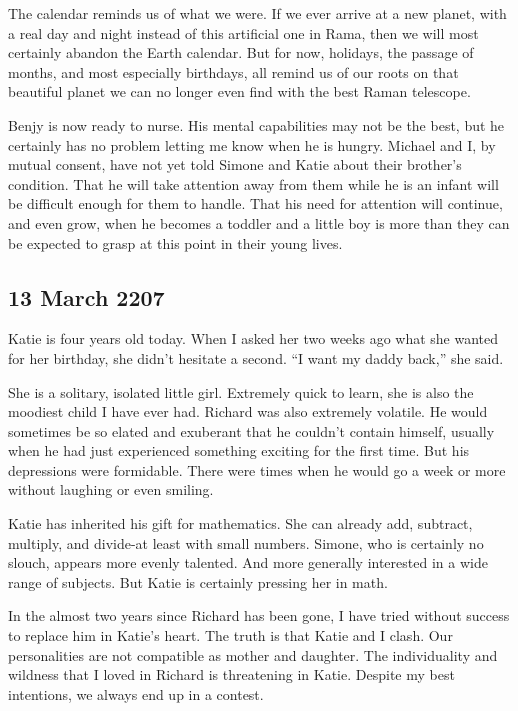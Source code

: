 \documentclass[]{article}
\begin{document}
The calendar reminds us of what we were.  If we ever arrive at a new planet, with a real day and night instead of this artificial one in Rama, then we will most certainly abandon the Earth calendar.  But for now, holidays, the passage of months, and most especially birthdays, all remind us of our roots on that beautiful planet we can no longer even find with the best Raman telescope.

Benjy is now ready to nurse.  His mental capabilities may not be the best, but he certainly has no problem letting me know when he is hungry.  Michael and I, by mutual consent, have not yet told Simone and Katie about their brother’s condition.  That he will take attention away from them while he is an infant will be difficult enough for them to handle.  That his need for attention will continue, and even grow, when he becomes a toddler and a little boy is more than they can be expected to grasp at this point in their young lives.

\subsection*{13 March 2207}

Katie is four years old today.  When I asked her two weeks ago what she wanted for her birthday, she didn’t hesitate a second.  “I want my daddy back,” she said.

She is a solitary, isolated little girl.  Extremely quick to learn, she is also the moodiest child I have ever had.  Richard was also extremely volatile.  He would sometimes be so elated and exuberant that he couldn’t contain himself, usually when he had just experienced something exciting for the first time.  But his depressions were formidable.  There were times when he would go a week or more without laughing or even smiling.

Katie has inherited his gift for mathematics.  She can already add, subtract, multiply, and divide-at least with small numbers.  Simone, who is certainly no slouch, appears more evenly talented.  And more generally interested in a wide range of subjects.  But Katie is certainly pressing her in math.

In the almost two years since Richard has been gone, I have tried without success to replace him in Katie’s heart.  The truth is that Katie and I clash.  Our personalities are not compatible as mother and daughter.  The individuality and wildness that I loved in Richard is threatening in Katie.  Despite my best intentions, we always end up in a contest.
\end{document}
